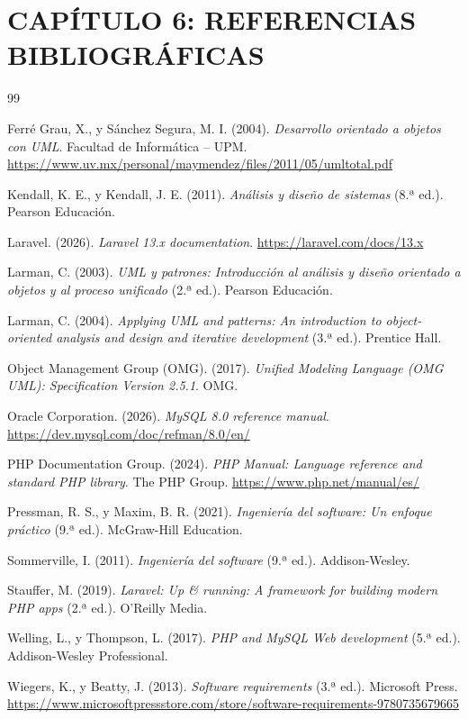 \documentclass[12pt,a4paper]{article}
\begin{document}
\clearpage
\section{CAP\'ITULO 6: REFERENCIAS BIBLIOGR\'AFICAS}

\begin{thebibliography}{99}
  \setlength{\itemsep}{6pt}
  \setlength{\parskip}{0pt}

  Ferré Grau, X., y Sánchez Segura, M. I. (2004). \textit{Desarrollo orientado a objetos con UML}. Facultad de Informática -- UPM. \url{https://www.uv.mx/personal/maymendez/files/2011/05/umltotal.pdf}

  Kendall, K. E., y Kendall, J. E. (2011). \textit{Análisis y diseño de sistemas} (8.ª ed.). Pearson Educación.

  Laravel. (2026). \textit{Laravel 13.x documentation}. \url{https://laravel.com/docs/13.x}

  Larman, C. (2003). \textit{UML y patrones: Introducción al análisis y diseño orientado a objetos y al proceso unificado} (2.ª ed.). Pearson Educación.

  Larman, C. (2004). \textit{Applying UML and patterns: An introduction to object-oriented analysis and design and iterative development} (3.ª ed.). Prentice Hall.

  Object Management Group (OMG). (2017). \textit{Unified Modeling Language (OMG UML): Specification Version 2.5.1}. OMG.

  Oracle Corporation. (2026). \textit{MySQL 8.0 reference manual}. \url{https://dev.mysql.com/doc/refman/8.0/en/}

  PHP Documentation Group. (2024). \textit{PHP Manual: Language reference and standard PHP library}. The PHP Group. \url{https://www.php.net/manual/es/}

  Pressman, R. S., y Maxim, B. R. (2021). \textit{Ingeniería del software: Un enfoque práctico} (9.ª ed.). McGraw-Hill Education.

  Sommerville, I. (2011). \textit{Ingeniería del software} (9.ª ed.). Addison-Wesley.

  Stauffer, M. (2019). \textit{Laravel: Up \& running: A framework for building modern PHP apps} (2.ª ed.). O'Reilly Media.

  Welling, L., y Thompson, L. (2017). \textit{PHP and MySQL Web development} (5.ª ed.). Addison-Wesley Professional.

  Wiegers, K., y Beatty, J. (2013). \textit{Software requirements} (3.ª ed.). Microsoft Press. \url{https://www.microsoftpressstore.com/store/software-requirements-9780735679665}
\end{thebibliography}
\end{document}
